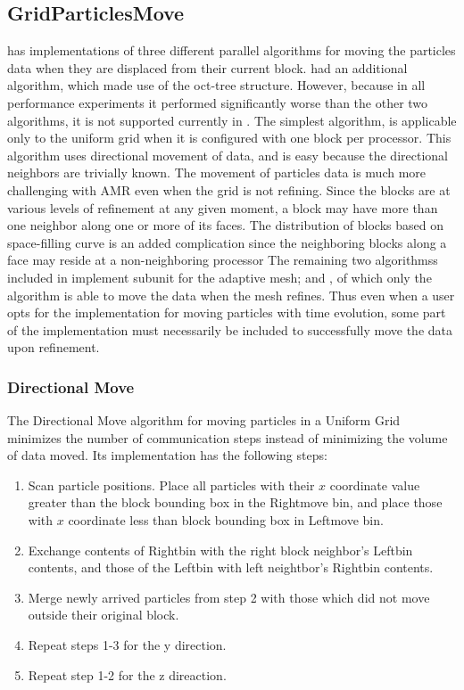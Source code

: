 \subsection{GridParticlesMove}
\label{Sec:GridParticlesMove}
\flashx has implementations of three different parallel algorithms
for moving the particles data when they are displaced from their
current block. \flashx had an additional algorithm,  which made use of the oct-tree structure. However,
because in all performance experiments it performed significantly
worse than the other two algorithms, it is not supported currently in
\flashx. The simplest algorithm,  is  
applicable only to the uniform grid when it is configured with one
block per processor. This algorithm uses directional movement of data,
and is easy because the directional neighbors are trivially known. 
The movement of particles data is much more challenging with AMR even
when the grid is not refining. Since the blocks are at various
levels of refinement at any given moment, a block may have more than one
neighbor along one or more of its faces. The distribution of blocks
based on space-filling curve is an added complication since the
neighboring blocks along a face may reside at a non-neighboring processor
The remaining two algorithmss included in \flashx implement
 subunit for the adaptive mesh;   and , of which only the  algorithm
is able to move the data when the mesh refines. Thus even when a user
opts for the  implementation for moving particles
with time evolution, some part of the  implementation must
necessarily be included to  successfully move the data upon
refinement.   

\subsubsection{Directional Move}
\label{Sec: ug_algorithm}
The Directional Move algorithm for moving particles in a Uniform Grid 
minimizes the number of communication steps instead of minimizing
the volume of data moved. Its implementation has the following steps:
\begin{enumerate}
\item Scan particle positions.  Place all particles with their $x$
coordinate value greater than the block bounding box in the Rightmove
bin, and place those with $x$ coordinate less than block bounding box in
Leftmove bin.
\item Exchange contents of Rightbin with the right block neighbor's Leftbin
contents, and those of the Leftbin with left neightbor's Rightbin
contents.
\item Merge newly arrived particles from step 2 with those which did not move outside their original block.
\item Repeat steps 1-3 for the y direction.
\item Repeat step 1-2 for the z direaction.
\end {enumerate}

